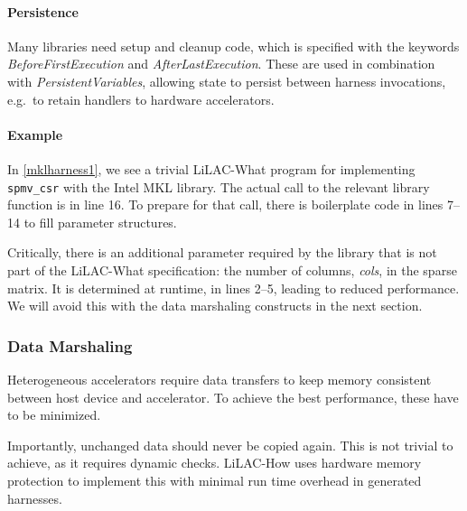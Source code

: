 \paragraph{Persistence}
Many libraries need setup and cleanup code, which is specified with the
keywords {\em BeforeFirstExecution} and {\em AfterLastExecution}.
These are used in combination with {\em PersistentVariables}, allowing state to
persist between harness invocations, e.g.\ to retain handlers to hardware
accelerators.

\paragraph{Example}
In \autoref{mklharness1}, we see a trivial LiLAC-What program for implementing
\texttt{spmv\_csr} with the Intel MKL library.
The actual call to the relevant library function is in line 16.
To prepare for that call, there is boilerplate code in lines 7--14 to fill
parameter structures.

Critically, there is an additional parameter required by the library that is
not part of the LiLAC-What specification: the number of columns, {\em cols}, in
the sparse matrix.
It is determined at runtime, in lines 2--5, leading to reduced performance.
We will avoid this with the data marshaling constructs in the next section.

\subsubsection{Data Marshaling}
Heterogeneous accelerators require data transfers to keep memory consistent
between host device and accelerator.
To achieve the best performance, these have to be minimized.

Importantly, unchanged data should never be copied again.
This is not trivial to achieve, as it requires dynamic checks.
LiLAC-How uses hardware memory protection to implement this with minimal
run time overhead in generated harnesses.

